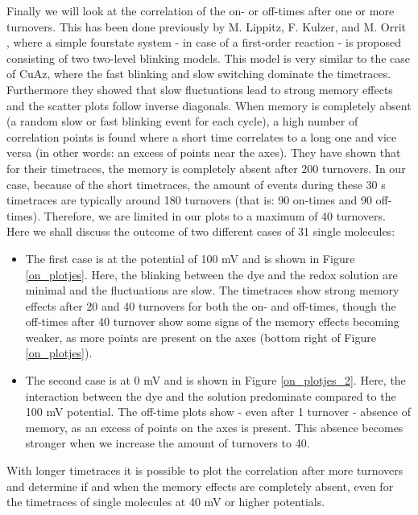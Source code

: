 \documentclass[twoside,single]{lion-msc}
\begin{document}
Finally we will look at the correlation of the on- or off-times after one or more turnovers. This has been done previously by M. Lippitz, F. Kulzer, and M. Orrit \cite{Lippitz2005}, where a simple fourstate system - in case of a first-order reaction - is proposed consisting of two two-level blinking models. This model is very similar to the case of CuAz, where the fast blinking and slow switching dominate the timetraces. Furthermore they showed that slow fluctuations lead to strong memory effects and the scatter plots follow inverse diagonals. When memory is completely absent (a random slow or fast blinking event for each cycle), a high number of correlation points is found where a short time correlates to a long one and vice versa (in other words: an excess of points near the axes). They have shown that for their timetraces, the memory is completely absent after 200 turnovers.
In our case, because of the short timetraces, the amount of events during these 30 s timetraces are typically around 180 turnovers (that is: 90 on-times and 90 off-times). Therefore, we are limited in our plots to a maximum of 40 turnovers. Here we shall discuss the outcome of two different cases of 31 single molecules:
\begin{itemize}
\item  The first case is at the potential of 100 mV and is shown in Figure \ref{on_plotjes}. Here, the blinking between the dye and the redox solution are minimal and the fluctuations are slow. The timetraces show strong memory effects after 20 and 40 turnovers for both the on- and off-times, though the off-times after 40 turnover show some signs of the memory effects becoming weaker, as more points are present on the axes (bottom right of Figure \ref{on_plotjes}). 
\item The second case is at 0 mV and is shown in Figure \ref{on_plotjes_2}. Here, the interaction between the dye and the solution predominate compared to the 100 mV potential. The off-time plots show - even after 1 turnover - absence of memory, as an excess of points on the axes is present. This absence becomes stronger when we increase the amount of turnovers to 40. 
\end{itemize}
With longer timetraces it is possible to plot the correlation after more turnovers and determine if and when the memory effects are completely absent, even for the timetraces of single molecules at 40 mV or higher potentials.


\newpage
\end{document}
